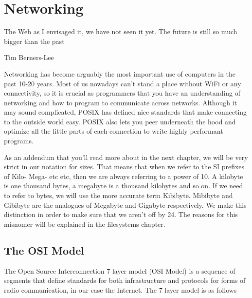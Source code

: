 \chapter{Networking}

\epigraph{The Web as I envisaged it, we have not seen it yet.
  The future is still so much bigger than the past}{Tim Berners-Lee}

Networking has become arguably the most important use of computers in the past 10-20 years.
Most of us nowadays can't stand a place without WiFi or any connectivity, so it is crucial as programmers that you have an understanding of networking and how to program to communicate across networks.
Although it may sound complicated, POSIX has defined nice standards that make connecting to the outside world easy.
POSIX also lets you peer underneath the hood and optimize all the little parts of each connection to write highly performant programs.

As an addendum that you'll read more about in the next chapter, we will be very strict in our notation for sizes.
That means that when we refer to the SI prefixes of Kilo- Mega- etc etc, then we are always referring to a power of 10.
A kilobyte is one thousand bytes, a megabyte is a thousand kilobytes and so on.
If we need to refer to  bytes, we will use the more accurate term Kibibyte. Mibibyte and Gibibyte are the analogues of Megabyte and Gigabyte respectively.
We make this distinction in order to make sure that we aren't off by 24.
The reasons for this misnomer will be explained in the filesystems chapter.

\section{The OSI Model}

The Open Source Interconnection 7 layer model (OSI Model) is a sequence of segments that define standards for both infrastructure and protocols for forms of radio communication, in our case the Internet.
The 7 layer model is as follows

